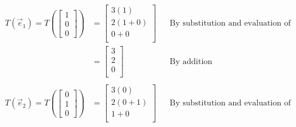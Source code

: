 \documentclass[10pt,letterpaper,final]{report}
\newcommand{\reason}[1]{&& \text{#1}}
\begin{document}
\begin{enumerate}[label=(\alph*)]
        \begin{align*}
          T(\vec{e}_1) = T(\begin{bmatrix}1\\0\\0\end{bmatrix}) & = \begin{bmatrix}
                                                                      3(1)     \\
                                                                      2(1 + 0) \\
                                                                      0 + 0    \\
                                                                    \end{bmatrix} \reason{By substitution and evaluation of T} \\[1ex]
                                                                & = \begin{bmatrix}
                                                                      3 \\
                                                                      2 \\
                                                                      0 \\
                                                                    \end{bmatrix} \reason{By addition}                         \\[1ex]
        \end{align*}
        \begin{align*}
          T(\vec{e}_2) = T(\begin{bmatrix}0\\1\\0\end{bmatrix}) & = \begin{bmatrix}
                                                                      3(0)     \\
                                                                      2(0 + 1) \\
                                                                      1 + 0    \\
                                                                    \end{bmatrix} \reason{By substitution and evaluation of T} \\[1ex]

\end{align*}
\end{enumerate}
\end{document}
